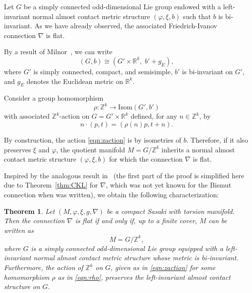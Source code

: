 \documentclass{article}
\newtheorem{thm}{Theorem}[section]
\theoremstyle{definition}
\renewcommand{\phi}{\varphi}
\numberwithin{equation}{section}
\begin{document}
\medskip

Let $G$ be a simply connected odd-dimensional Lie group endowed with a left-invariant normal almost contact metric structure $(\phi,\xi,b)$ such that $b$ is bi-invariant.  
As we have already observed, the associated Friedrich-Ivanov connection $\nabla$ is flat.

\medskip

By a result of Milnor~\cite{Mil}, we can write
\[
(G,b) \cong (G' \times \mathbb{R}^k, \; b' + g_E),
\]
where $G'$ is simply connected, compact, and semisimple, $b'$ is bi-invariant on $G'$, and $g_E$ denotes the Euclidean metric on $\mathbb{R}^k$.  

Consider a group homomorphism
\begin{equation} \label{eqn:rho}
\rho: \mathbb{Z}^k \to \mathrm{Isom}(G',b')
\end{equation}
with associated $\mathbb{Z}^k$-action on $G = G' \times \mathbb{R}^k$ defined, for any $n \in \mathbb{Z}^k$, by
\begin{equation} \label{eqn:zaction}
n \cdot (p,t) = (\rho(n) p, t+n).
\end{equation}

By construction, the action \eqref{eqn:zaction} is by isometries of $b$.  
Therefore, if it also preserves $\xi$ and $\phi$, the quotient manifold $
M = G / \mathbb{Z}^k $ 
inherits a normal almost contact metric structure $(\phi,\xi,b)$ for which the connection $\nabla$ is flat.

\medskip

Inspired by the analogous result in~\cite{WYZ} (the first part of the proof is simplified here due to Theorem~\ref{thm:CKL} for $\nabla$, which was not yet known for the Bismut connection when \cite{WYZ} was written), we obtain the following characterization:


\begin{thm} \label{thm:flat}
Let \((M, \phi, \xi, g, \nabla)\) be a compact Sasaki with torsion manifold.  
Then the connection $\nabla$ is flat if and only if, up to a finite cover, $M$ can be written as
\[
M = G / \mathbb{Z}^k,
\]
where $G$ is a simply connected odd-dimensional Lie group equipped with a left-invariant normal almost contact metric structure whose metric is bi-invariant.  
Furthermore, the action of $\mathbb{Z}^k$ on $G$, given as in \eqref{eqn:zaction} for some homomorphism $\rho$ as in \eqref{eqn:rho}, preserves the left-invariant almost contact structure on $G$. 
\end{thm}
\end{document}
